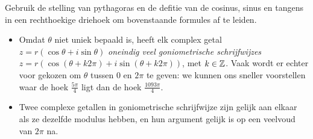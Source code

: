 \documentclass{ximera}
\begin{document}
 
\begin{quickquestion*}{}
    Gebruik de stelling van pythagoras en de defitie van de cosinus, sinus en tangens in een rechthoekige driehoek om bovenstaande formules af te leiden. 
\end{quickquestion*}
 

 
\begin{remark}\nl
     
    \begin{itemize}
        \item Omdat $\theta$ niet uniek bepaald is, heeft elk complex getal $z = r(\cos\theta+i\sin\theta)$ \textit{oneindig veel goniometrische schrijfwijzes} $z = r\left(\cos(\theta+k2\pi)+i\sin(\theta+k2\pi) \right)$, met $k\in\mathbb{Z}$. Vaak wordt er echter voor gekozen om $\theta$ tussen 0 en $2\pi$ te geven: we kunnen ons sneller voorstellen waar de hoek $\frac{5\pi}{4}$ ligt dan de hoek $\frac{1093\pi}{4}$.
        \item Twee complexe getallen in goniometrische schrijfwijze zijn gelijk aan elkaar als ze dezelfde modulus hebben, en hun argument gelijk is op een veelvoud van $2\pi$ na.
    \end{itemize}
     
\end{remark}
\end{document}
